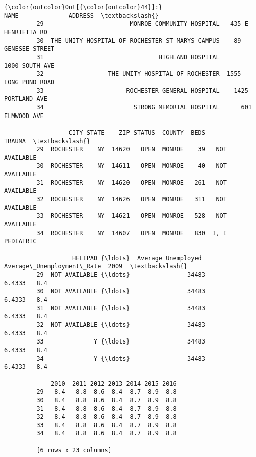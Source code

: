 \documentclass[11pt]{article}
\begin{document}
\begin{Verbatim}[commandchars=\\\{\}]
{\color{outcolor}Out[{\color{outcolor}44}]:}                                                NAME              ADDRESS  \textbackslash{}
         29                        MONROE COMMUNITY HOSPITAL   435 E HENRIETTA RD   
         30  THE UNITY HOSPITAL OF ROCHESTER-ST MARYS CAMPUS    89 GENESEE STREET   
         31                                HIGHLAND HOSPITAL       1000 SOUTH AVE   
         32                  THE UNITY HOSPITAL OF ROCHESTER  1555 LONG POND ROAD   
         33                       ROCHESTER GENERAL HOSPITAL    1425 PORTLAND AVE   
         34                         STRONG MEMORIAL HOSPITAL      601 ELMWOOD AVE   
         
                  CITY STATE    ZIP STATUS  COUNTY  BEDS          TRAUMA  \textbackslash{}
         29  ROCHESTER    NY  14620   OPEN  MONROE    39   NOT AVAILABLE   
         30  ROCHESTER    NY  14611   OPEN  MONROE    40   NOT AVAILABLE   
         31  ROCHESTER    NY  14620   OPEN  MONROE   261   NOT AVAILABLE   
         32  ROCHESTER    NY  14626   OPEN  MONROE   311   NOT AVAILABLE   
         33  ROCHESTER    NY  14621   OPEN  MONROE   528   NOT AVAILABLE   
         34  ROCHESTER    NY  14607   OPEN  MONROE   830  I, I PEDIATRIC   
         
                   HELIPAD {\ldots}  Average Unemployed   Average\_Unemployment\_Rate  2009  \textbackslash{}
         29  NOT AVAILABLE {\ldots}                34483                     6.4333   8.4   
         30  NOT AVAILABLE {\ldots}                34483                     6.4333   8.4   
         31  NOT AVAILABLE {\ldots}                34483                     6.4333   8.4   
         32  NOT AVAILABLE {\ldots}                34483                     6.4333   8.4   
         33              Y {\ldots}                34483                     6.4333   8.4   
         34              Y {\ldots}                34483                     6.4333   8.4   
         
             2010  2011 2012 2013 2014 2015 2016  
         29   8.4   8.8  8.6  8.4  8.7  8.9  8.8  
         30   8.4   8.8  8.6  8.4  8.7  8.9  8.8  
         31   8.4   8.8  8.6  8.4  8.7  8.9  8.8  
         32   8.4   8.8  8.6  8.4  8.7  8.9  8.8  
         33   8.4   8.8  8.6  8.4  8.7  8.9  8.8  
         34   8.4   8.8  8.6  8.4  8.7  8.9  8.8  
         
         [6 rows x 23 columns]
\end{Verbatim}
            
\end{document}
